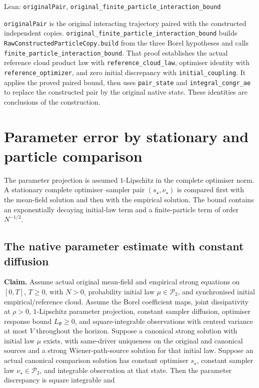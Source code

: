 \documentclass[11pt,a4paper]{report}
\newcommand{\leanlabel}[1]{\par\smallskip\noindent{\small\bfseries #1}\par}
\begin{document}
\begin{leanbox}{Lean: \texttt{originalPair}, \texttt{original\_\allowbreak{}finite\_\allowbreak{}particle\_\allowbreak{}interaction\_\allowbreak{}bound}}
\leanlabel{How the Lean proof follows the argument}
\texttt{original\allowbreak{}Pair} is the original interacting trajectory paired with the constructed independent copies. \texttt{original\_\allowbreak{}finite\_\allowbreak{}particle\_\allowbreak{}interaction\_\allowbreak{}bound} builds \texttt{Raw\allowbreak{}Constructed\allowbreak{}Particle\allowbreak{}Copy.\allowbreak{}build} from the three Borel hypotheses and calls \texttt{finite\_\allowbreak{}particle\_\allowbreak{}interaction\_\allowbreak{}bound}. That proof establishes the actual reference cloud product law with \texttt{reference\_\allowbreak{}cloud\_\allowbreak{}law}, optimiser identity with \texttt{reference\_\allowbreak{}optimizer}, and zero initial discrepancy with \texttt{initial\_\allowbreak{}coupling}. It applies the proved paired bound, then uses \texttt{pair\_\allowbreak{}state} and \texttt{integral\_\allowbreak{}congr\_\allowbreak{}ae} to replace the constructed pair by the original native state. These identities are conclusions of the construction.
\end{leanbox}
\section{\texorpdfstring{Parameter error by stationary and particle comparison}{Parameter error by stationary and particle comparison}}


The parameter projection is assumed \(1\)-Lipschitz in the complete optimiser norm. A stationary complete optimiser–sampler pair \((s_\star,\nu_\star)\) is compared first with the mean-field solution and then with the empirical solution. The bound contains an exponentially decaying initial-law term and a finite-particle term of order \(N^{-1/2}\).

\subsection{\texorpdfstring{The native parameter estimate with constant diffusion}{The native parameter estimate with constant diffusion}}


\textbf{Claim.} Assume actual original mean-field and empirical strong equations on \([0,T]\), \(T\ge0\), with \(N>0\), probability initial law \(\mu\in\mathcal P_2\), and synchronised initial empirical/\allowbreak{}reference cloud. Assume the Borel coefficient maps, joint dissipativity at \(\rho>0\), \(1\)-Lipschitz parameter projection, constant sampler diffusion, optimiser response bound \(L_\Psi\ge0\), and square-integrable observations with centred variance at most \(V\) throughout the horizon. Suppose a canonical strong solution with initial law \(\mu\) exists, with same-driver uniqueness on the original and canonical sources and a strong Wiener-path-source solution for that initial law. Suppose an actual canonical comparison solution has constant optimiser \(s_\star\), constant sampler law \(\nu_\star\in\mathcal P_2\), and integrable observation at that state. Then the parameter discrepancy is square integrable and
\end{document}
